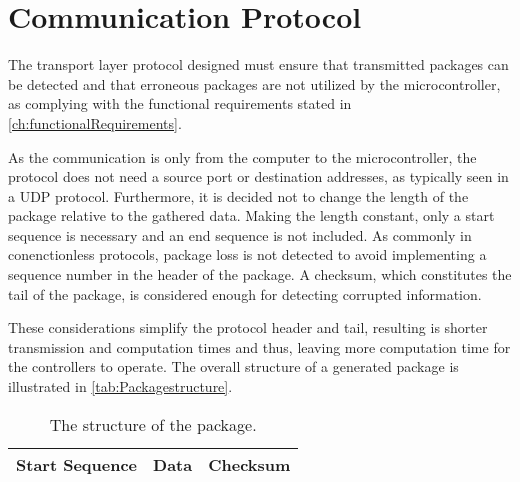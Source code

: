 \section{Communication Protocol}
The transport layer protocol designed must ensure that transmitted packages can be detected and that erroneous packages are not utilized by the microcontroller, as complying with the functional requirements stated in \autoref{ch:functionalRequirements}.
%


As the communication is only from the computer to the microcontroller, the protocol does not need a source port or destination addresses, as typically seen in a UDP protocol. Furthermore, it is decided not to change the length of the package relative to the gathered data. Making the length constant, only a start sequence is necessary and an end sequence is not included. As commonly in conenctionless protocols, package loss is not detected to avoid implementing a sequence number in the header of the package. A checksum, which constitutes the tail of the package, is considered enough for detecting corrupted information. 

These considerations simplify the protocol header and tail, resulting is shorter transmission and computation times and thus, leaving more computation time for the controllers to operate. The overall structure of a generated package is illustrated in \autoref{tab:Packagestructure}.
\begin{table}[H]\centering
\begin{tabular}{|>{\centering\arraybackslash}m{3cm}|>{\centering\arraybackslash}m{2cm}|>{\centering\arraybackslash}m{2cm}|}
\hline
Start Sequence & Data & Checksum \\
\hline
\end{tabular}
\caption{The structure of the package.}
\label{tab:Packagestructure}
\end{table}


